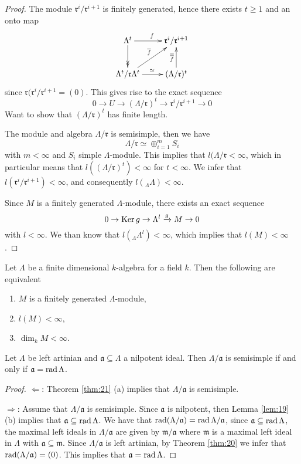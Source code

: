 \begin{proof}
The module $\mathfrak{r}^i/\mathfrak{r}^{i+1}$ is finitely generated,
hence there exists $t\geq 1$ and an onto map
\[\xymatrix{
\Lambda^t \ar[r]^f\ar@{->>}[d] &  \mathfrak{r}^i/\mathfrak{r}^{i+1}\\
\Lambda^t/\mathfrak{r}\Lambda^t \ar[ur]^{\overline{f}}\ar[r]^\simeq &
(\Lambda/\mathfrak{r})^t \ar[u]^{\overline{\overline{f}}}
}\]
since $\mathfrak{r}(\mathfrak{r}^i/\mathfrak{r}^{i+1} = (0)$. This
gives rise to the exact sequence 
\[0\to U\to (\Lambda/\mathfrak{r})^t \to
  \mathfrak{r}^i/\mathfrak{r}^{i+1}\to 0\]
Want to show that $(\Lambda/\mathfrak{r})^t$ has finite length. 

The module and algebra $\Lambda/\mathfrak{r}$ is semisimple, then we
have
\[\Lambda/\mathfrak{r} \simeq \oplus_{i=1}^m S_i\]
with $m<\infty$ and $S_i$ simple $\Lambda$-module. This implies that
$l(\Lambda/\mathfrak{r} <\infty$, which in particular means that
$l((\Lambda/\mathfrak{r})^t) < \infty$ for $t < \infty$.  We infer
that $l(\mathfrak{r}^i/\mathfrak{r}^{i+1}) < \infty$, and consequently
$l({_\Lambda\Lambda}) < \infty$. 

Since $M$ is a finitely generated $\Lambda$-module, there exists an
exact sequence
\[0\to \operatorname{Ker}\nolimits g \to \Lambda^l \xrightarrow{g} M\to 0\]
with $l<\infty$.  We than know that $l({_\Lambda\Lambda^l}) < \infty$,
  which implies that $l(M) < \infty$. 
\end{proof}

\begin{exer}
Let $\Lambda$ be a finite dimensional $k$-algebra for a field $k$.
Then the following are equivalent 
\begin{enumerate}[\rm(i)]
\item $M$ is a finitely generated $\Lambda$-module,
\item $l(M) < \infty$, 
\item $\dim_k M < \infty$. 
\end{enumerate}
\end{exer}

\begin{thm}\label{thm:23}
Let $\Lambda$ be left artinian and $\mathfrak{a}\subseteq \Lambda$ a
nilpotent ideal.  Then $\Lambda/\mathfrak{a}$ is semisimple if and
only if $\mathfrak{a} = \operatorname{rad}\nolimits \Lambda$. 
\end{thm}
\begin{proof}
$\Leftarrow$: Theorem \ref{thm:21} (a) implies that
$\Lambda/\mathfrak{a}$ is semisimple. 

$\Rightarrow$: Assume that $\Lambda/\mathfrak{a}$ is semisimple.
Since $\mathfrak{a}$ is nilpotent, then Lemma \ref{lem:19} (b) implies
that $\mathfrak{a}\subseteq \operatorname{rad}\nolimits\Lambda$.  We have that
$\operatorname{rad}\nolimits(\Lambda/\mathfrak{a}) = \operatorname{rad}\nolimits \Lambda/\mathfrak{a}$, since
$\mathfrak{a} \subseteq \operatorname{rad}\nolimits\Lambda$, the maximal left ideals in
$\Lambda/\mathfrak{a}$ are given by $\mathfrak{m}/\mathfrak{a}$ where
$\mathfrak{m}$ is a maximal left ideal in $\Lambda$ with
$\mathfrak{a}\subseteq \mathfrak{m}$.  Since $\Lambda/\mathfrak{a}$ is
left artinian, by Theorem \ref{thm:20} we infer that $\operatorname{rad}\nolimits
(\Lambda/\mathfrak{a}) = (0)$.  This implies that $\mathfrak{a} =
\operatorname{rad}\nolimits\Lambda$. 
\end{proof}

